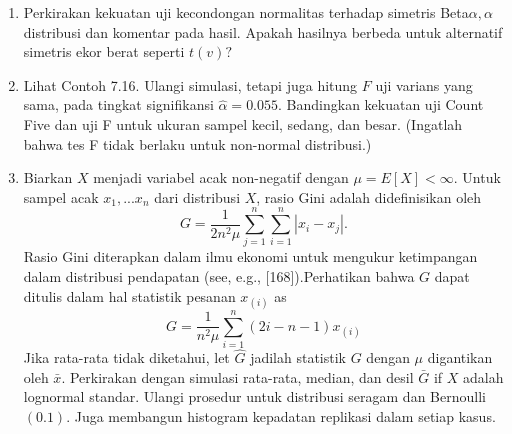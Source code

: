 \documentclass[a4paper,12pt]{article}
\theoremstyle{definition}
\begin{document}
\begin{enumerate}
\item Perkirakan kekuatan uji kecondongan normalitas terhadap simetris Beta$\alpha ,\alpha $ distribusi dan komentar pada hasil. Apakah hasilnya berbeda untuk alternatif simetris ekor berat seperti $t(v)?$
\item Lihat Contoh 7.16. Ulangi simulasi, tetapi juga hitung $F$ uji varians yang sama, pada tingkat signifikansi $\hat{\alpha } = 0.055$. Bandingkan kekuatan uji Count Five dan uji F untuk ukuran sampel kecil, sedang, dan besar. (Ingatlah bahwa tes F tidak berlaku untuk non-normal distribusi.)
\item  Biarkan $X$ menjadi variabel acak non-negatif dengan $\mu = E\left [ X \right ] < \infty $. Untuk sampel acak $x_{1},...x_{n}$ dari distribusi $X$, rasio Gini adalah didefinisikan oleh 
\[
G =\frac{1}{2n^{2}\mu }\sum_{j=1}^{n}\sum_{i=1}^{n}\left | x_{i} -x_{j}\right |.
\]
Rasio Gini diterapkan dalam ilmu ekonomi untuk mengukur ketimpangan dalam distribusi pendapatan (see, e.g., [168]).Perhatikan bahwa $G$ dapat ditulis dalam hal statistik pesanan $x_{(i)}$ as
\[
G=\frac{1}{n^{2}\mu }\sum_{i=1}^{n}(2i-n-1)x_{(i)}
\]
Jika rata-rata tidak diketahui, let $\hat{G}$  jadilah statistik $G$ dengan $\mu$ digantikan oleh $\bar{x}$.  Perkirakan dengan simulasi rata-rata, median, dan desil $\bar{G}$ if $X$ adalah lognormal standar. Ulangi prosedur untuk distribusi seragam dan Bernoulli $(0.1)$. Juga membangun histogram kepadatan replikasi dalam setiap kasus.
\end{enumerate} 




\newpage
\printbibliography[heading=bibintoc,title={Daftar Pustaka}]
\end{document}
